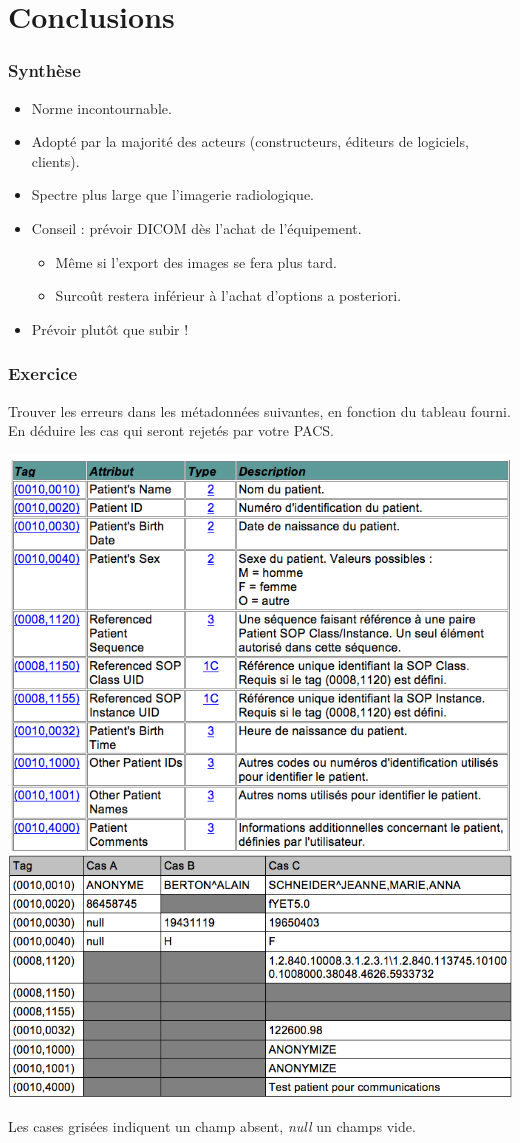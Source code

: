 \section{Conclusions}

\frame
{
	\frametitle{Synth\`ese}
	
	\begin{itemize}
		\item Norme incontournable.
		\item Adopt\'e par la majorit\'e des acteurs (constructeurs, \'editeurs de logiciels, clients).
		\item Spectre plus large que l'imagerie radiologique.
		\item Conseil : pr\'evoir DICOM d\`es l'achat de l'\'equipement.
		\begin{itemize}
			\item M\^eme si l'export des images se fera plus tard.
			\item Surco\^ut restera inf\'erieur \`a l'achat d'options a posteriori.
		\end{itemize}
		\item Pr\'evoir plut\^ot que subir !
	\end{itemize}
}

\frame
{
    \frametitle{Exercice}
    Trouver les erreurs dans les m\'etadonn\'ees suivantes, en fonction du tableau fourni.
    En d\'eduire les cas qui seront rejet\'es par votre PACS.

	\includegraphics[width=.5\linewidth]{./figures/table.png}
	\includegraphics[width=.5\linewidth]{./figures/metadata-cases.png}
    
    Les cases gris\'ees indiquent un champ absent, \emph{null} un champs vide.
}

